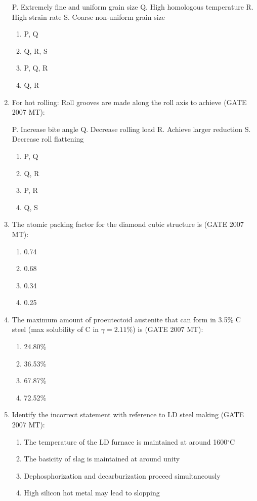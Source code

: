 \documentclass[12pt]{article}
\begin{document}
\begin{enumerate}
P. Extremely fine and uniform grain size  
Q. High homologous temperature  
R. High strain rate  
S. Coarse non-uniform grain size

\begin{enumerate}
  \item P, Q
  \item Q, R, S
  \item P, Q, R
  \item Q, R
\end{enumerate}

\item For hot rolling: Roll grooves are made along the roll axis to achieve (GATE 2007 MT):

P. Increase bite angle  
Q. Decrease rolling load  
R. Achieve larger reduction  
S. Decrease roll flattening

\begin{enumerate}
  \item P, Q
  \item Q, R
  \item P, R
  \item Q, S
\end{enumerate}
\setcounter{enumi}{40} %

\item The atomic packing factor for the diamond cubic structure is (GATE 2007 MT):
  \begin{enumerate}[label=(\Alph*)]
    \item 0.74
    \item 0.68
    \item 0.34
    \item 0.25
  \end{enumerate}

\item The maximum amount of proeutectoid austenite that can form in 3.5\% C steel (max solubility of C in $\gamma = 2.11$\%) is (GATE 2007 MT):
  \begin{enumerate}[label=(\Alph*)]
    \item 24.80\%
    \item 36.53\%
    \item 67.87\%
    \item 72.52\%
  \end{enumerate}

\item Identify the incorrect statement with reference to LD steel making (GATE 2007 MT):
  \begin{enumerate}[label=(\Alph*)]
    \item The temperature of the LD furnace is maintained at around 1600$^\circ$C
    \item The basicity of slag is maintained at around unity
    \item Dephosphorization and decarburization proceed simultaneously
    \item High silicon hot metal may lead to slopping
  \end{enumerate}


\end{enumerate}
\end{document}
